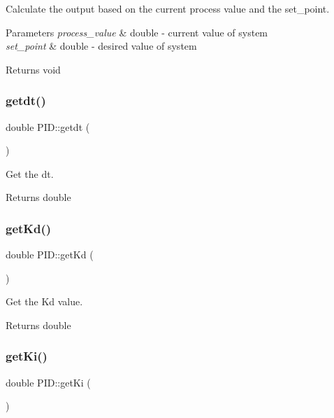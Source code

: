 Calculate the output based on the current process value and the set\+\_\+point. 


\begin{DoxyParams}{Parameters}
{\em process\+\_\+value} & double -\/ current value of system \\
\hline
{\em set\+\_\+point} & double -\/ desired value of system \\
\hline
\end{DoxyParams}
\begin{DoxyReturn}{Returns}
void 
\end{DoxyReturn}
\mbox{\label{classPID_a642e7bc12fbd7ecfe465d50be8d20b36}} 
\subsubsection{\texorpdfstring{getdt()}{getdt()}}
{\footnotesize\ttfamily double P\+I\+D\+::getdt (\begin{DoxyParamCaption}{ }\end{DoxyParamCaption})}



Get the dt. 

\begin{DoxyReturn}{Returns}
double 
\end{DoxyReturn}
\mbox{\label{classPID_a39997546e8d1025c6c867e31e8b8e916}} 
\subsubsection{\texorpdfstring{get\+Kd()}{getKd()}}
{\footnotesize\ttfamily double P\+I\+D\+::get\+Kd (\begin{DoxyParamCaption}{ }\end{DoxyParamCaption})}



Get the Kd value. 

\begin{DoxyReturn}{Returns}
double 
\end{DoxyReturn}
\mbox{\label{classPID_a89dedae29ef5a1359fd438824523bfc5}} 
\subsubsection{\texorpdfstring{get\+Ki()}{getKi()}}
{\footnotesize\ttfamily double P\+I\+D\+::get\+Ki (\begin{DoxyParamCaption}{ }\end{DoxyParamCaption})}



